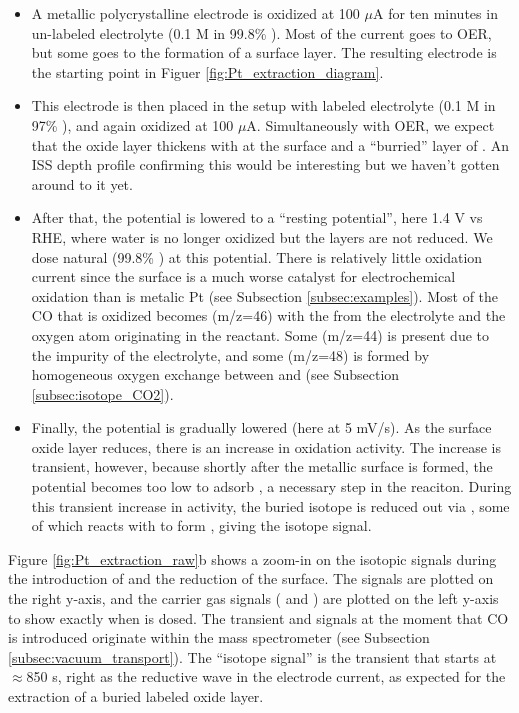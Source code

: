 \begin{itemize}
\item A metallic polycrystalline  electrode is oxidized at 100 $\mu$A for ten minutes in un-labeled electrolyte (0.1 M  in 99.8\% ). Most of the current goes to OER, but some goes to the formation of a  surface layer. The resulting electrode is the starting point in Figuer \ref{fig:Pt_extraction_diagram}.

\item This electrode is then placed in the setup with labeled electrolyte (0.1 M  in 97\% ), and again oxidized at 100 $\mu$A. Simultaneously with OER, we expect that the oxide layer thickens with  at the surface and a ``burried'' layer of . An ISS depth profile confirming this would be interesting but we haven't gotten around to it yet. 

\item After that, the potential is lowered to a ``resting potential'', here 1.4 V vs RHE, where water is no longer oxidized but the  layers are not reduced. We dose natural  (99.8\% ) at this potential. There is relatively little  oxidation current since the  surface is a much worse catalyst for electrochemical  oxidation than is metalic Pt (see Subsection \ref{subsec:examples}). Most of the CO that is oxidized becomes  (m/z=46) with the  from the electrolyte and the  oxygen atom originating in the  reactant. Some  (m/z=44) is present due to the impurity of the electrolyte, and some  (m/z=48) is formed by homogeneous oxygen exchange between  and  (see Subsection \ref{subsec:isotope_CO2}).

\item Finally, the potential is gradually lowered (here at 5 mV/s). As the surface oxide layer reduces, there is an increase in  oxidation activity. The increase is transient, however, because shortly after the metallic surface is formed, the potential becomes too low to adsorb , a necessary step in the reaciton. During this transient increase in activity, the buried  isotope is reduced out via , some of which reacts with  to form , giving the isotope signal.
\end{itemize}

Figure \ref{fig:Pt_extraction_raw}b shows a zoom-in on the  isotopic signals during the introduction of  and the reduction of the surface. The  signals are plotted on the right y-axis, and the carrier gas signals ( and ) are plotted on the left y-axis to show exactly when  is dosed. The transient  and  signals at the moment that CO is introduced originate within the mass spectrometer (see Subsection \ref{subsec:vacuum_transport}). The ``isotope signal'' is the   transient that starts at $\approx$850 s, right as the reductive wave in the electrode current, as expected for the extraction of a buried labeled oxide layer. 

